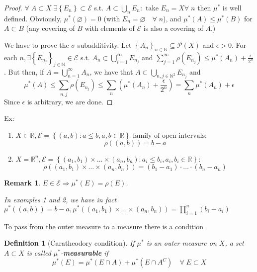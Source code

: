 \documentclass[a4paper,12pt]{article}
\theoremstyle{break}
\newtheorem{remark}[section]{Remark}
\newtheorem{definition}{Definition}[section]
\let\emptyset\varnothing
\numberwithin{equation}{section}
\begin{document}
\begin{proof}
    \(\forall \; A \subset X \; \exists \left\lbrace E_n \right\rbrace \subset \mathcal{E}\) s.t. \(A \subset \bigcup_n E_n : \mbox{ take } E_n = X \forall \; n\)
    then \(\mu^*\) is well defined. Obviously, \(\mu^*(\emptyset) = 0\) (with \(E_n = \emptyset \quad \forall\; n\)), and \(\mu^*(A) \leq \mu^*(B)\) for \(A \subset B\) (any covering of \(B\) with elements of \(\mathcal{E}\) is also a covering of \(A\).)

    We have to prove the \(\sigma\)-subadditivity. Let \(\left\lbrace A_n \right\rbrace_{n \in \mathbb{N}} \subseteq \mathcal{P}(X)\) and \(\epsilon > 0\). For each \(n, \exists \left\lbrace E_{n_j} \right\rbrace_{j \in \mathbb{N}} \in \mathcal{E}\) s.t. \(A_n \subset \bigcup_{i = 1}^{\infty} E_{n_j}\) and \(\sum_{j=1}^{\infty} \rho(E_{n_j}) \leq \mu^*(A_n) + \frac{\epsilon}{2^n}\).  
    But then, if \(A = \bigcup_{n=1}^{\infty} A_n\), we have that \(A \subset \bigcup_{n,j \in \mathbb{N}^2} E_{n_j}\) and
    \[
        \mu^*(A) \leq \sum_{n,j} \rho(E_{n_j}) \leq \sum_{n} \left(\mu^*(A_n) + \frac{\epsilon}{2^n}\right) = \sum_{n} \mu^*(A_n) + \epsilon
    \]
    Since \(\epsilon\) is arbitrary, we are done.
\end{proof}
Ex:  
\begin{enumerate}
    \item \(X \in \mathbb{R}, \mathcal{E} = \left\lbrace (a,b) : a \leq b, a,b \in \mathbb{R} \right\rbrace \mbox{ family of open intervals:} \)
    \[
        \rho((a,b)) = b-a
    \]
    
    \item \(X = \mathbb{R}^n, \mathcal{E} = \left\lbrace (a_1, b_1) \times \ldots \times (a_n, b_n) : a_i \leq b_i, a_i, b_i \in \mathbb{R} \right\rbrace\): 
    \[
        \rho((a_1, b_1)\times \ldots \times (a_n, b_n)) = (b_1 -a_1) \cdot \ldots \cdot (b_n - a_n)
    \]
\end{enumerate}
\begin{remark}
    \(E \in \mathcal{E} \Longrightarrow \mu^*(E) = \rho(E)\).  

    In examples 1 and 2, we have in fact \(\mu^*((a,b)) = b-a, \mu^*\left((a_1, b_1) \times \ldots \times (a_n, b_n)\right) = \prod_{i=1}^{n} (b_i - a_i)\) 
\end{remark}
To pass from the outer measure to a measure there is a condition 
\begin{definition}[Caratheodory condition]
    If \(\mu^*\) is an outer measure on \(X\), a set \(A \subset X\) is called \(\mu^*\)-\textbf{measurable} if 
    \[
        \mu^*(E) = \mu^*(E \cap A) + \mu^*(E \cap A^C) \quad \forall \; E \subset X
    \]
\end{definition}
\end{document}
